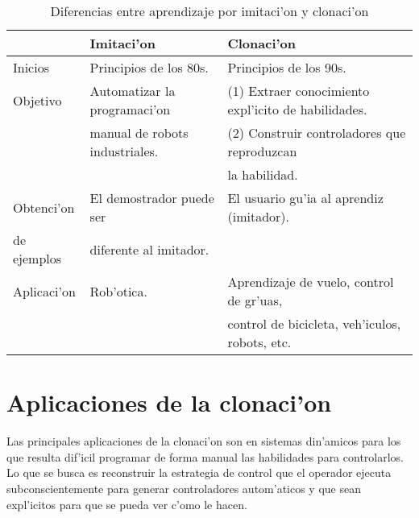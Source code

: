\documentclass[11pt]{article}
\begin{document}
\begin{table}[h]
\begin{center}
\begin{small}
\begin{tabular}{|l|l|l|} 

\hline
& \textsf{Imitaci'on}  & \textsf{Clonaci'on}\\
\hline
Inicios & Principios de los 80s.  &    Principios de los 90s.\\ \hline
Objetivo& Automatizar la programaci'on  & (1) Extraer conocimiento expl'icito de habilidades.\\ 
				& manual de robots industriales. & (2) Construir controladores que reproduzcan\\ 
				& 															 & \hspace{0.5cm} la habilidad.\\ \hline
Obtenci'on 		& 	El demostrador puede ser 		 	&  El usuario gu'ia al aprendiz (imitador).\\ 
de ejemplos		& 	diferente al imitador.		 		&  \\ \hline
Aplicaci'on 		& 	Rob'otica. 		 	&  Aprendizaje de vuelo, control de gr'uas,\\ 
											 		& 								 	&  control de bicicleta, veh'iculos, robots, etc. \\ 
\hline

\end{tabular}
\end{small}
\end{center}
\caption[Diferencias entre \textsf{imitaci'on} y \textsf{clonaci'on}]{Diferencias entre \textsf{aprendizaje por imitaci'on} y \textsf{clonaci'on}}
\label{tab:imiclon}
\end{table} 

\section{Aplicaciones de la clonaci'on}
Las principales aplicaciones de la clonaci'on son en sistemas din'amicos para los que resulta dif'icil programar de forma manual las habilidades para controlarlos. Lo que se busca es reconstruir la estrategia de control que el operador ejecuta subconscientemente para generar controladores autom'aticos y que sean expl'icitos para que se pueda ver c'omo le hacen.
\end{document}
